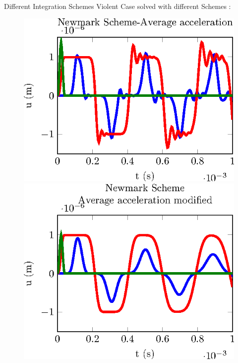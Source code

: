 \documentclass[10pt,a4paper]{beamer}
\begin{document}
\begin{frame}{Different Integration Schemes} 
	Violent Case solved with different Schemes :
	\begin{figure}
		\begin{minipage}{0.35\linewidth}
			\includegraphics[width=1\linewidth]{CalculSchem3b.T1.tikz.eps}
		\end{minipage}
		 \hspace{1cm}
		\begin{minipage}{0.35\linewidth}
			\includegraphics[width=1\linewidth]{CalculSchem4.T1.tikz.eps}

\end{minipage}
\end{figure}
\end{frame}
\end{document}
